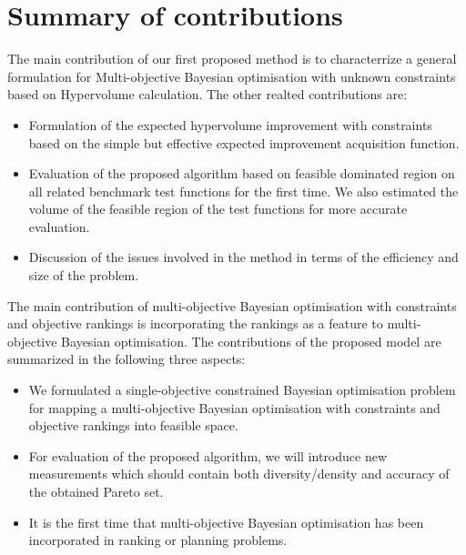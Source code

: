 \section{Summary of contributions}
The main contribution of our first proposed method is to characterrize a general formulation for Multi-objective Bayesian optimisation with unknown constraints based on Hypervolume calculation. The other realted contributions are:
\begin{itemize}
\item Formulation of the expected hypervolume improvement with constraints based on the simple but effective expected improvement acquisition function.
\item Evaluation of the proposed algorithm based on feasible dominated region on all related benchmark test functions for the first time. We also estimated the volume of the feasible region of the test functions for more accurate evaluation.
\item Discussion of the issues involved in the method in terms of the efficiency and size of the problem.
\end{itemize}
The main contribution of multi-objective Bayesian optimisation with constraints and objective rankings is incorporating the rankings as a feature to multi-objective Bayesian optimisation. The contributions of the proposed model are summarized in the following three aspects:
\begin{itemize}
\item We formulated a single-objective constrained Bayesian optimisation problem for mapping a multi-objective Bayesian optimisation with constraints and 
objective rankings into feasible space.
\item For evaluation of the proposed algorithm, we will introduce new measurements which should contain both diversity/density and accuracy of the obtained Pareto set.
\item It is the first time that multi-objective Bayesian optimisation has been incorporated in ranking or planning problems.
\end{itemize}
